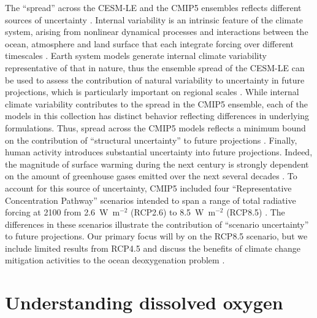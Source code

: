 \documentclass[draft,linenumbers]{report_chapter}
\begin{document}
The ``spread'' across the CESM-LE and the CMIP5 ensembles reflects different sources of uncertainty \citep{Hawkins-Sutton-2009}.
Internal variability is an intrinsic feature of the climate system, arising from nonlinear dynamical processes and interactions between the ocean, atmosphere and land surface that each integrate forcing over different timescales \citep{Hasselmann-1976}.
Earth system models generate internal climate variability representative of that in nature, thus the ensemble spread of the CESM-LE can be used to assess the contribution of natural variability to uncertainty in future projections, which is particularly important on regional scales \citep{Deser-Phillips-etal-2012,Lovenduski-McKinley-etal-2016,McKinley-Pilcher-etal-2016}.
While internal climate variability contributes to the spread in the CMIP5 ensemble, each of the models in this collection has distinct behavior reflecting differences in underlying formulations.
Thus, spread across the CMIP5 models reflects a minimum bound on the contribution of ``structural uncertainty'' to future projections \citep{Hawkins-Sutton-2009,Lovenduski-McKinley-etal-2016}.
Finally, human activity introduces substantial uncertainty into future projections.
Indeed, the magnitude of surface warming during the next century is strongly dependent on the amount of greenhouse gases emitted over the next several decades \citep{Collins-Knutti-etal-2013}.
To account for this source of uncertainty, CMIP5 included four ``Representative Concentration Pathway'' scenarios intended to span a range of total radiative forcing at 2100 from 2.6~W~m$^{-2}$ (RCP2.6) to 8.5~W~m$^{-2}$ (RCP8.5) \citep{Meinshausen-Smith-etal-2011}.
The differences in these scenarios illustrate the contribution of ``scenario uncertainty'' to future projections.
Our primary focus will by on the RCP8.5 scenario, but we include limited results from RCP4.5 and discuss the benefits of climate change mitigation activities to the ocean deoxygenation problem \citep{Henson-Beaulieu-etal-2017}.

\section{Understanding dissolved oxygen}\label{loc:o2-distributions}
\end{document}
